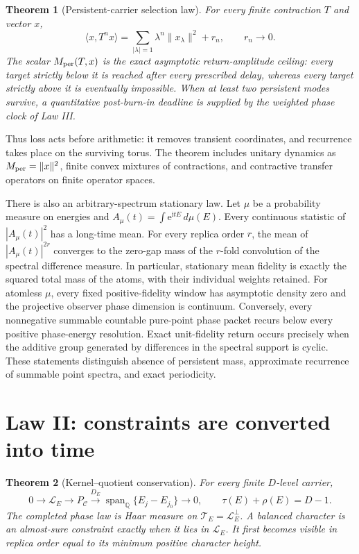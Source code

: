 \documentclass[10pt]{article}
\newtheorem{theorem}{Theorem}
\theoremstyle{definition}
\newcommand{\Q}{\mathbb Q}
\newcommand{\ee}{\mathrm e}
\newcommand{\ii}{\mathrm i}
\newcommand{\Rel}{\mathcal L}
\newcommand{\Hull}{\mathcal T}
\newcommand{\Carrier}{\mathcal C}
\begin{document}
\begin{theorem}[Persistent-carrier selection law]
\label{thm:carrier}
For every finite contraction $T$ and vector $x$,
\begin{equation}
 \langle x,T^nx\rangle
 =\sum_{|\lambda|=1}\lambda^n\|x_\lambda\|^2+r_n,
 \qquad r_n\longrightarrow0.                           \label{eq:persistentdecomp}
\end{equation}
The scalar $M_{\rm per}(T,x)$ is the exact asymptotic return-amplitude
ceiling: every target strictly below it is reached after every prescribed
delay, whereas every target strictly above it is eventually impossible.
When at least two persistent modes survive, a quantitative post-burn-in
deadline is supplied by the weighted phase clock of Law III.
\end{theorem}

Thus loss acts before arithmetic: it removes transient coordinates, and
recurrence takes place on the surviving torus.  The theorem includes unitary
dynamics as $M_{\rm per}=\|x\|^2$, finite convex mixtures of contractions,
and contractive transfer operators on finite operator spaces.

There is also an arbitrary-spectrum stationary law.  Let $\mu$ be a
probability measure on energies and
$A_\mu(t)=\int\ee^{\ii tE}\,d\mu(E)$.  Every continuous statistic of
$|A_\mu(t)|^2$ has a long-time mean.  For every replica order $r$, the
mean of $|A_\mu(t)|^{2r}$ converges to the zero-gap mass of the $r$-fold
convolution of the spectral difference measure.  In particular, stationary
mean fidelity is exactly the squared total mass of the atoms, with their
individual weights retained.  For atomless $\mu$, every fixed
positive-fidelity window has asymptotic density zero and the projective
observer phase dimension is continuum.  Conversely, every nonnegative
summable countable pure-point phase packet recurs below every positive
phase-energy resolution.  Exact unit-fidelity return occurs precisely when
the additive group generated by differences in the spectral support is
cyclic.  These statements distinguish
absence of persistent mass, approximate recurrence of summable point
spectra, and exact periodicity.

\section{Law II: constraints are converted into time}

\begin{theorem}[Kernel--quotient conservation]
\label{thm:kernel}
For every finite $D$-level carrier,
\begin{equation}
 0\longrightarrow\Rel_E\longrightarrow P_{\Carrier}
  \xrightarrow{D_E}\operatorname{span}_{\Q}\{E_j-E_{j_0}\}
  \longrightarrow0,
 \qquad \boxed{\tau(E)+\rho(E)=D-1}.                   \label{eq:conservation}
\end{equation}
The completed phase law is Haar measure on $\Hull_E=\Rel_E^\perp$.  A
balanced character is an almost-sure constraint exactly when it lies in
$\Rel_E$.  It first becomes visible in replica order equal to its minimum
positive character height.
\end{theorem}
\end{document}
